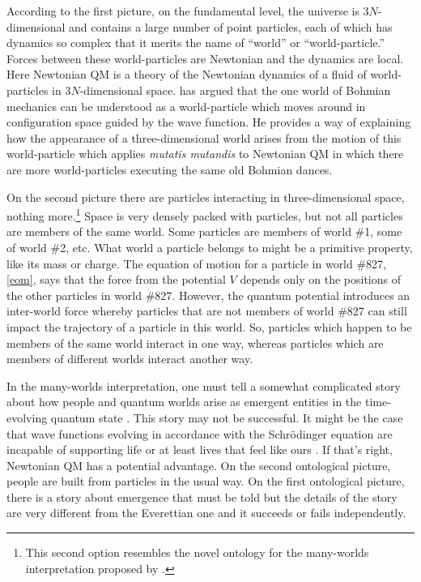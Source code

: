 \documentclass[onecolumn,secnumarabic,balancelastpage,amsmath,amssymb,nofootinbib]{article}
\begin{document}
According to the first picture, on the fundamental level, the universe is 3$N$-dimensional and contains a large number of point particles, each of which has dynamics so complex that it merits the name of ``world'' or ``world-particle.''  Forces between these world-particles are Newtonian and the dynamics are local.  Here Newtonian QM is a theory of the Newtonian dynamics of a fluid of world-particles in 3$N$-dimensional space.  \citet{albert1996} has argued that the one world of Bohmian mechanics can be understood as a world-particle which moves around in configuration space guided by the wave function.  He provides a way of explaining how the appearance of a three-dimensional world arises from the motion of this world-particle which applies \emph{mutatis mutandis} to Newtonian QM in which there are more world-particles executing the same old Bohmian dances.

On the second picture there are particles interacting in three-dimensional space, nothing more.\footnote{This second option resembles the novel ontology for the many-worlds interpretation proposed by \citet{allori2011}.}  Space is very densely packed with particles, but not all particles are members of the same world.  Some particles are members of world \#1, some of world \#2, etc.  What world a particle belongs to might be a primitive property, like its mass or charge.  The equation of motion for a particle in world \#827, \eqref{eom}, says that the force from the potential $V$ depends only on the positions of the other particles in world \#827.  However, the quantum potential introduces an inter-world force whereby particles that are not members of world \#827 can still impact the trajectory of a particle in this world.  So, particles which happen to be members of the same world interact in one way, whereas particles which are members of different worlds interact another way. 
 
In the many-worlds interpretation, one must tell a somewhat complicated story about how people and quantum worlds arise as emergent entities in the time-evolving quantum state \citep[e.g.,][]{wallace2003}.  This story may not be successful.  It might be the case that wave functions evolving in accordance with the Schr\"{o}dinger equation are incapable of supporting life or at least lives that feel like ours \citep{maudlin2010}.  If that's right, Newtonian QM has a potential advantage.  On the second ontological picture, people are built from particles in the usual way.  On the first ontological picture, there is a story about emergence that must be told but the details of the story are very different from the Everettian one and it succeeds or fails independently.
\end{document}

